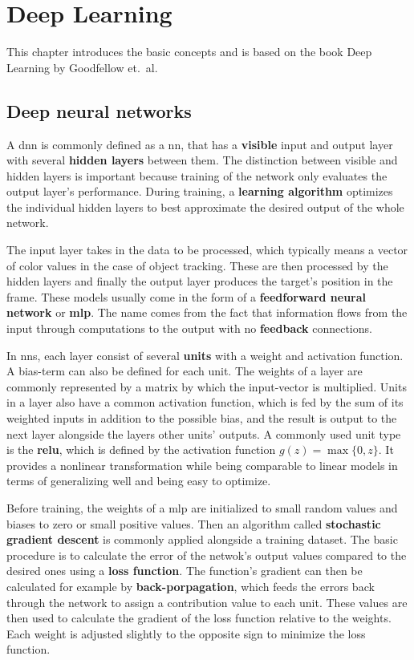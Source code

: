 \section{Deep Learning}

This chapter introduces the basic concepts and is based on the book Deep Learning by
Goodfellow et.~al.~\cite{DEEP_LEARNING}

\subsection{Deep neural networks}

A \ac{dnn} is commonly defined as a \ac{nn}, that has a \textbf{visible} input and
output layer with several \textbf{hidden layers} between them. The distinction between
visible and hidden layers is important because training of the network only evaluates
the output layer's performance. During training, a \textbf{learning algorithm} optimizes
the individual hidden layers to best approximate the desired output of the whole network.

The input layer takes in the data to be processed, which typically means a vector of
color values in the case of object tracking. These are then processed by the hidden
layers and finally the output layer produces the target's position in the frame. These
models usually come in the form of a \textbf{feedforward neural network} or
\textbf{\ac{mlp}}. The name comes from the fact that information flows from the input
through computations to the output with no \textbf{feedback} connections.

In \ac{nn}s, each layer consist of several \textbf{units} with a weight and activation
function. A bias-term can also be defined for each unit. The weights of a layer are
commonly represented by a matrix by which the input-vector is multiplied. Units in a
layer also have a common activation function, which is fed by the sum of its weighted
inputs in addition to the possible bias, and the result is output to the next layer
alongside the layers other units' outputs. A commonly used unit type is the \textbf{\ac{relu}},
which is defined by the activation function $g (z) = \max\{0,z\}$. It provides a
nonlinear transformation while being comparable to linear models in terms of generalizing
well and being easy to optimize.

Before training, the weights of a \ac{mlp} are initialized to small random values and 
biases to zero or small positive values. Then an algorithm called \textbf{stochastic
gradient descent} is commonly applied alongside a training dataset. The basic procedure
is to calculate the error of the netwok's output values compared to the desired ones 
using a \textbf{loss function}. The function's gradient can then be calculated for
example by \textbf{back-porpagation}, which feeds the errors back through the network
to assign a contribution value to each unit. These values are then used to calculate
the gradient of the loss function relative to the weights. Each weight is adjusted
slightly to the opposite sign to minimize the loss function.


